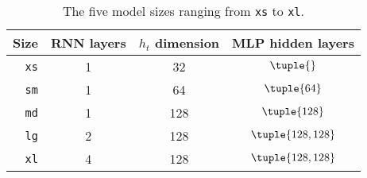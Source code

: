 \begin{table}
	\begin{tabular}{r ccc}
		\hline
		Size        & RNN layers & $h_t$ dimension & MLP hidden layers  \\
		\hline
		\texttt{xs} & 1          & 32              & $\tuple{}$         \\
		\texttt{sm} & 1          & 64              & $\tuple{64}$       \\
		\texttt{md} & 1          & 128             & $\tuple{128}$      \\
		\texttt{lg} & 2          & 128             & $\tuple{128, 128}$ \\
		\texttt{xl} & 4          & 128             & $\tuple{128, 128}$ \\
		\hline
	\end{tabular}
	\caption{The five model sizes ranging from \texttt{xs} to \texttt{xl}.}
	\label{tbl:model-sizes}
\end{table}

